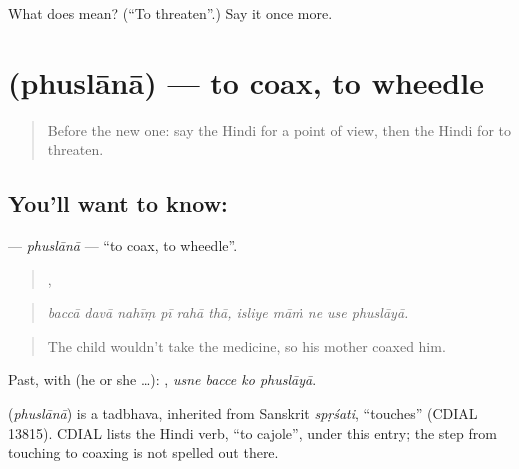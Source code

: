 \begin{tcolorbox}[breakable,colback=teal!4,colframe=teal!35!black,title={Before you move on}]
What does  mean? (\textquotedblleft{}To threaten\textquotedblright{}.) Say it once more.
\end{tcolorbox}
\section[\texorpdfstring{\hi{फुसलाना} (phuslānā)}{फुसलाना (phuslānā)}]{ (phuslānā) — to coax, to wheedle}

\label{lesson:HI-C360-phuslana}



\begin{quote}
Before the new one: say the Hindi for a point of view, then the Hindi for to threaten.
\end{quote}

\subsection*{You'll want to know: }
\textbf{} — \emph{phuslānā} — \textquotedblleft{}to coax, to wheedle\textquotedblright{}.

\begin{quote}
     ,     
\end{quote}

\begin{quote}
\emph{baccā davā nahīṃ pī rahā thā, isliye māṁ ne use phuslāyā.}
\end{quote}

\begin{quote}
The child wouldn't take the medicine, so his mother coaxed him.
\end{quote}

Past, with  (he or she …):    , \emph{usne bacce ko phuslāyā}.

\begin{cousinweb}
\textbf{} (\emph{phuslānā}) is a tadbhava, inherited from Sanskrit \emph{spṛśati}, \textquotedblleft{}touches\textquotedblright{} (CDIAL 13815). CDIAL lists the Hindi verb, \textquotedblleft{}to cajole\textquotedblright{}, under this entry; the step from touching to coaxing is not spelled out there.
\end{cousinweb}

